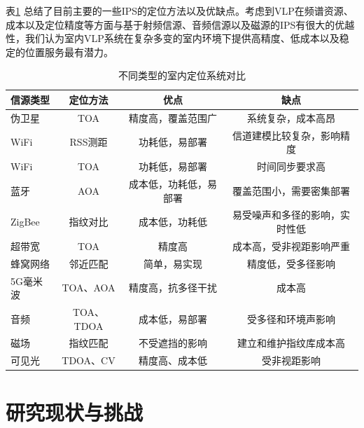 表\ref{tab:positioning-systems} 总结了目前主要的一些IPS的定位方法以及优缺点。考虑到VLP在频谱资源、成本以及定位精度等方面与基于射频信源、音频信源以及磁源的IPS有很大的优越性，我们认为室内VLP系统在复杂多变的室内环境下提供高精度、低成本以及稳定的位置服务最有潜力。
\begin{table}[!htbp]
  \centering 
  \small
  \caption{不同类型的室内定位系统对比}  
  \label{tab:positioning-systems}  
  \begin{tabularx}{\textwidth}{lccc}
    \toprule
   \textbf{信源类型}   &   \textbf{定位方法}     & \textbf{优点}     &\textbf{缺点} \\
    \midrule
    伪卫星    &   TOA   &   精度高，覆盖范围广    &     系统复杂，成本高昂  \\
    
    WiFi    &   RSS测距   &   功耗低，易部署  & 信道建模比较复杂，影响精度  \\
    WiFi    &   TOA   &   功耗低，易部署  & 时间同步要求高  \\

    蓝牙    &   AOA   &   成本低，功耗低，易部署  & 覆盖范围小，需要密集部署  \\
    
    ZigBee    &   指纹对比   &   成本低，功耗低   &  易受噪声和多径的影响，实时性低  \\
    
    超带宽    &   TOA   &   精度高    &成本高，受非视距影响严重  \\
    
   蜂窝网络    &   邻近匹配   &   简单，易实现    &精度低，受多径影响  \\
   
   5G毫米波    &   TOA、AOA   &   精度高，抗多径干扰    &成本高  \\

   音频    &   TOA、TDOA   &   成本低，易部署    &受多径和环境声影响  \\
   
   磁场 &   指纹匹配   &不受遮挡的影响       &建立和维护指纹库成本高  \\
   
   可见光 &   TDOA、CV   &精度高、成本低       &受非视距影响  \\
   
    \bottomrule
  \end{tabularx}%
\end{table}%



\section{研究现状与挑战}

